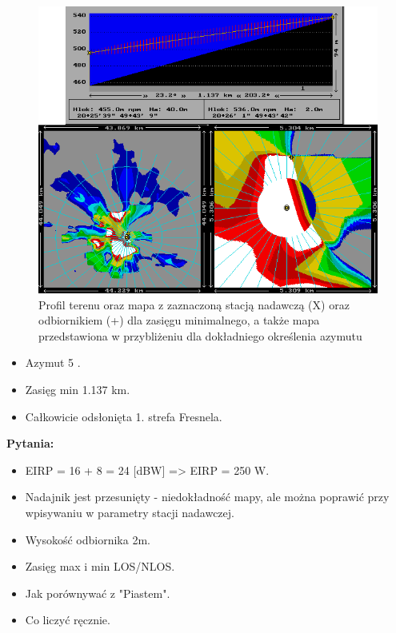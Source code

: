 \documentclass[12pt, a4paper, oneside]{article}
\begin{document}
\begin{figure}[h!]
\centering
\includegraphics[scale=1]{pics/f4.png}
\caption{Profil terenu oraz mapa z zaznaczoną stacją nadawczą (X) oraz odbiornikiem (+) dla zasięgu minimalnego, a także mapa przedstawiona w przybliżeniu dla dokładniego określenia azymutu}
\end{figure}
\begin{itemize}
\item Azymut 5 \textdegree.
\item Zasięg min 1.137 km.
\item Całkowicie odsłonięta 1. strefa Fresnela.
\end{itemize}
{\bf Pytania:}
\begin{itemize}
\item EIRP = 16 + 8 = 24 [dBW] => EIRP = 250 W.
\item Nadajnik jest przesunięty - niedokładność mapy, ale można poprawić przy wpisywaniu w parametry stacji nadawczej.
\item Wysokość odbiornika 2m.
\item Zasięg max i min LOS/NLOS.
\item Jak porównywać z "Piastem".
\item Co liczyć ręcznie.
\end{itemize}
\end{document}
